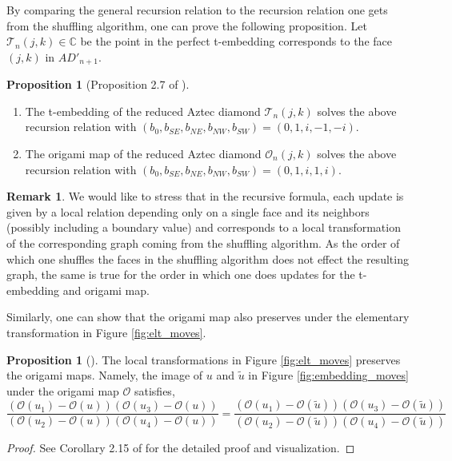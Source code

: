\documentclass[12pt]{amsart}
\newcommand{\cT}{\mathcal T}
\newcommand{\C}{{\mathbb C}}
\numberwithin{equation}{section}
\theoremstyle{definition}
\newtheorem{prop}[thm]{Proposition}
\newtheorem{remark}[thm]{Remark}
\begin{document}
By comparing the general recursion relation to the recursion relation one gets from the shuffling algorithm, one can prove the following proposition. Let $\cT_n(j,k) \in \C$ be the point in the perfect t-embedding corresponds to the face $(j,k)$ in $AD'_{n+1}$.

\begin{prop}[Proposition 2.7 of \cite{chelkak2021fluctuations}]
    \label{prop: AD_t_embedding}
    \hfill
    \begin{enumerate}
    \item The t-embedding of the reduced Aztec diamond $\mathcal{T}_n(j,k)$ solves the above recursion relation with $(b_0,b_{SE},b_{NE},b_{NW},b_{SW})=(0,1,i,-1,-i)$. 
    \item The origami map of the reduced Aztec diamond $\mathcal{O}_n(j,k)$ solves the above recursion relation with $(b_0,b_{SE},b_{NE},b_{NW},b_{SW})=(0,1,i,1,i)$.
    \end{enumerate}
\end{prop}


\begin{remark}\label{rmk:tembshuf}
    We would like to stress that in the recursive formula, each update is given by a local relation depending only on a single face and its neighbors (possibly including a boundary value) and corresponds to a local transformation of the corresponding graph coming from the shuffling algorithm. As the order of which one shuffles the faces in the shuffling algorithm does not effect the resulting graph, the same is true for the order in which one does updates for the t-embedding and origami map. 
\end{remark}

Similarly, one can show that the origami map also preserves under the elementary transformation in Figure \ref{fig:elt_moves}.

\begin{prop}[\cite{circle_pattern}]
    The local transformations in Figure \ref{fig:elt_moves} preserves the origami maps. Namely, the image of $u$ and $\tilde u$ in Figure \ref{fig:embedding_moves} under the origami map ${\mathcal O}$ satisfies, 
    $$
\frac{\left(\mathcal{O}\left(u_1\right)-\mathcal{O}(u)\right)\left(\mathcal{O}\left(u_3\right)-\mathcal{O}(u)\right)}{\left(\mathcal{O}\left(u_2\right)-\mathcal{O}(u)\right)\left(\mathcal{O}\left(u_4\right)-\mathcal{O}(u)\right)}=\frac{\left(\mathcal{O}\left(u_1\right)-\mathcal{O}(\tilde{u})\right)\left(\mathcal{O}\left(u_3\right)-\mathcal{O}(\tilde{u})\right)}{\left(\mathcal{O}\left(u_2\right)-\mathcal{O}(\tilde{u})\right)\left(\mathcal{O}\left(u_4\right)-\mathcal{O}(\tilde{u})\right)}
$$
\end{prop}
\begin{proof}
    See Corollary 2.15 of \cite{tower_AD_perfect} for the detailed proof and visualization. 
\end{proof}
\end{document}
